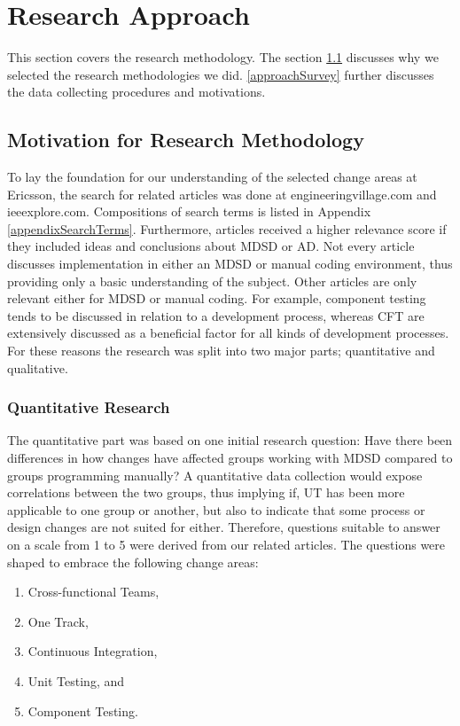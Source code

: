 \documentclass[final_report_innit.tex]{subfiles}
\begin{document}
\section{Research Approach}\label{approach}
This section covers the research methodology. The section \ref{approachChoice} discusses why we selected the research methodologies we did. \ref{approachSurvey} further discusses the data collecting procedures and motivations.


\subsection{Motivation for Research Methodology}\label{approachChoice}
To lay the foundation for our understanding of the selected change areas at Ericsson, the search for related articles was done at engineeringvillage.com and ieeexplore.com. Compositions of search terms is listed in Appendix \ref{appendixSearchTerms}. Furthermore, articles received a higher relevance score if they included ideas and conclusions about MDSD or AD. Not every article discusses implementation in either an MDSD or manual coding environment, thus providing only a basic understanding of the subject. Other articles are only relevant either for MDSD or manual coding. For example, component testing tends to be discussed in relation to a development process, whereas CFT are extensively discussed as a beneficial factor for all kinds of development processes.
\\

For these reasons the research was split into two major parts; quantitative and qualitative.
\\

\subsubsection{Quantitative Research}\label{approachQuant}
The quantitative part was based on one initial research question: Have there been differences in how changes have affected groups working with MDSD compared to groups programming manually? A quantitative data collection would expose correlations between the two groups, thus implying if, UT has been more applicable to one group or another, but also to indicate that some process or design changes are not suited for either. Therefore, questions suitable to answer on a scale from 1 to 5 were derived from our related articles. The questions were shaped to embrace the following change areas:
\\
\begin{enumerate}
	\item Cross-functional Teams,
	\item One Track,
	\item Continuous Integration,
	\item Unit Testing, and
	\item Component Testing. \\ %
\end{enumerate}
\end{document}
